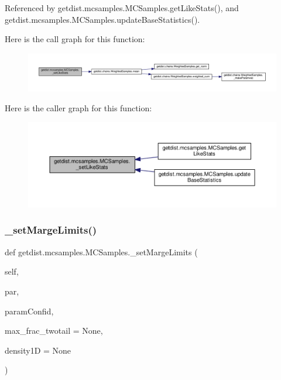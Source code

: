Referenced by getdist.\+mcsamples.\+M\+C\+Samples.\+get\+Like\+Stats(), and getdist.\+mcsamples.\+M\+C\+Samples.\+update\+Base\+Statistics().

Here is the call graph for this function\+:
\nopagebreak
\begin{figure}[H]
\begin{center}
\leavevmode
\includegraphics[width=350pt]{classgetdist_1_1mcsamples_1_1MCSamples_a9c6887c5c7470e1f684082b0c07f5169_cgraph}
\end{center}
\end{figure}
Here is the caller graph for this function\+:
\nopagebreak
\begin{figure}[H]
\begin{center}
\leavevmode
\includegraphics[width=350pt]{classgetdist_1_1mcsamples_1_1MCSamples_a9c6887c5c7470e1f684082b0c07f5169_icgraph}
\end{center}
\end{figure}
\mbox{\label{classgetdist_1_1mcsamples_1_1MCSamples_a90a8cf01a23a304a6e5fe07db7a74e1a}} 
\subsubsection{\texorpdfstring{\+\_\+set\+Marge\+Limits()}{\_setMargeLimits()}}
{\footnotesize\ttfamily def getdist.\+mcsamples.\+M\+C\+Samples.\+\_\+set\+Marge\+Limits (\begin{DoxyParamCaption}\item[{}]{self,  }\item[{}]{par,  }\item[{}]{param\+Confid,  }\item[{}]{max\+\_\+frac\+\_\+twotail = {\ttfamily None},  }\item[{}]{density1D = {\ttfamily None} }\end{DoxyParamCaption})\hspace{0.3cm}{\ttfamily [private]}}

